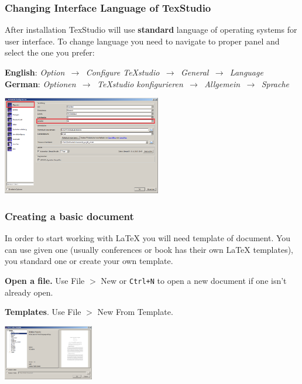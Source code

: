 \documentclass[slidestop,compress,mathserif]{beamer}
\begin{document}
\begin{frame} \frametitle{Changing Interface Language of TexStudio}
	After installation TexStudio will use \textbf{standard} language of operating systems for user interface. To change language you need to navigate to proper panel and select the one you prefer:
	
	\vspace{0.5cm}
	
	\tiny{
		\textbf{English}: \textit{Option $\,\to\,$ Configure TeXstudio $\,\to\,$ General $\,\to\,$ Language}\\
		\textbf{German}:  \textit{Optionen $\,\to\,$ TeXstudio konfigurieren $\,\to\,$ Allgemein $\,\to\,$ Sprache}\\
	}
	
	\begin{center}
		\includegraphics[height=1.7in]{basicsOfLatex/gettingStarted/texstudioLanguage}
	\end{center}
	
\end{frame}

\begin{frame} \frametitle{Creating a basic document}
	
	In order to start working with LaTeX you will need template of document. You can use given one (usually conferences or book has their own LaTeX templates), you standard one or create your own template.\\
	
	\vspace{0.5cm}
		
	{\bf Open a file.}  Use {\color{highlight}File $>$ New} or \texttt{\color{highlight}Ctrl+N}  to open a new document if one isn't already open. \\

	\vspace{0.5cm}

	{\bf Templates}. Use {\color{highlight} File $>$ New From Template}. \\
	\begin{center}
		\includegraphics[height=0.95in]{basicsOfLatex/gettingStarted/texstudioTemplate}
	\end{center}
\end{frame}
\end{document}

